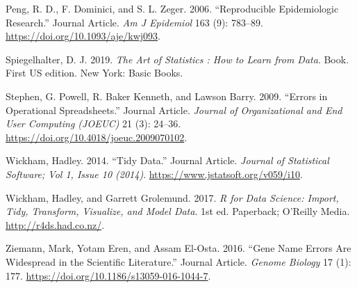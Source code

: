 \documentclass[
  11pt,
  letterpaper,
]{scrbook}
\newlength{\cslhangindent}
\newlength{\cslentryspacingunit} %
\newenvironment{CSLReferences}[2] %
 {%
  \setlength{\parindent}{0pt}
  \ifodd #1
  \let\oldpar\par
  \def\par{\hangindent=\cslhangindent\oldpar}
  \fi
  \setlength{\parskip}{#2\cslentryspacingunit}
 }%
 {}
\begin{document}
\begin{CSLReferences}{1}{0}
\leavevmode{}%
Peng, R. D., F. Dominici, and S. L. Zeger. 2006. {``Reproducible
Epidemiologic Research.''} Journal Article. \emph{Am J Epidemiol} 163
(9): 783--89. \url{https://doi.org/10.1093/aje/kwj093}.

\leavevmode{}%
Spiegelhalter, D. J. 2019. \emph{The Art of Statistics : How to Learn
from Data}. Book. First US edition. New York: Basic Books.

\leavevmode{}%
Stephen, G. Powell, R. Baker Kenneth, and Lawson Barry. 2009. {``Errors
in Operational Spreadsheets.''} Journal Article. \emph{Journal of
Organizational and End User Computing (JOEUC)} 21 (3): 24--36.
\url{https://doi.org/10.4018/joeuc.2009070102}.

\leavevmode{}%
Wickham, Hadley. 2014. {``Tidy Data.''} Journal Article. \emph{Journal
of Statistical Software; Vol 1, Issue 10 (2014)}.
\url{https://www.jstatsoft.org/v059/i10}.

\leavevmode{}%
Wickham, Hadley, and Garrett Grolemund. 2017. \emph{R for Data Science:
Import, Tidy, Transform, Visualize, and Model Data}. 1st ed. Paperback;
O'Reilly Media. \url{http://r4ds.had.co.nz/}.

\leavevmode{}%
Ziemann, Mark, Yotam Eren, and Assam El-Osta. 2016. {``Gene Name Errors
Are Widespread in the Scientific Literature.''} Journal Article.
\emph{Genome Biology} 17 (1): 177.
\url{https://doi.org/10.1186/s13059-016-1044-7}.

\end{CSLReferences}


\backmatter
\end{document}
